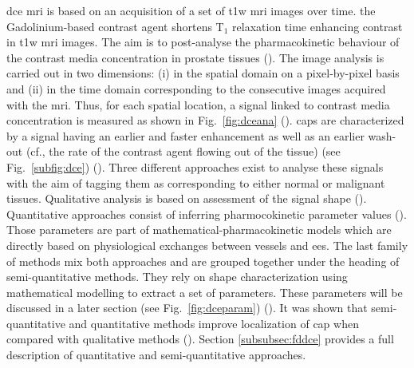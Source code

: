 \begin{enumerate}[leftmargin=*]
\ac{dce} \ac{mri} is based on an acquisition of a set of \ac{t1w} \ac{mri} images over time. the Gadolinium-based contrast agent shortens T$_1$ relaxation time enhancing contrast in \ac{t1w} \ac{mri} images. The aim is to post-analyse the pharmacokinetic behaviour of the contrast media concentration in prostate tissues (\cite{Verma2012}). The image analysis is carried out in two dimensions: (i) in the spatial domain on a pixel-by-pixel basis and (ii) in the time domain corresponding to the consecutive images acquired with the \ac{mri}. Thus, for each spatial location, a signal linked to contrast media concentration is measured as shown in Fig.~\ref{fig:dceana} (\cite{Tofts2010}). 
\acp{cap} are characterized by a signal having an earlier and faster enhancement as well as an earlier wash-out (cf., the rate of the contrast agent flowing out of the tissue) (see Fig.~\ref{subfig:dce}) (\cite{Verma2012}). Three different approaches exist to analyse these signals with the aim of tagging them as corresponding to either normal or malignant tissues. Qualitative analysis is based on assessment of the signal shape (\cite{Hoeks2011}). Quantitative approaches consist of inferring pharmocokinetic parameter values (\cite{Tofts2010}). Those parameters are part of mathematical-pharmacokinetic models which are directly based on physiological exchanges between vessels and \ac{ees}. %
The last family of methods mix both approaches and are grouped together under the heading of semi-quantitative methods. They rely on shape characterization using mathematical modelling to extract a set of parameters. %
These parameters will be discussed in a later section (see Fig.~\ref{fig:dceparam}) (\cite{Hoeks2011,Verma2012}). It was shown that semi-quantitative and quantitative methods improve localization of \ac{cap} when compared with qualitative methods (\cite{Rosenkrantz2013}). Section \ref{subsubsec:fddce} provides a full description of quantitative and semi-quantitative approaches.


\end{enumerate}
